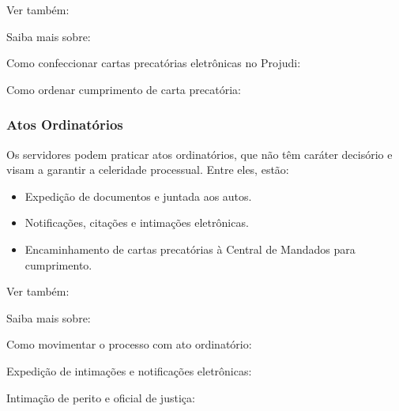 \documentclass[letterpaper,10pt,brazil]{sphinxmanual}
\begin{document}
\begin{sphinxseealso}{Ver também:}

\sphinxAtStartPar
Saiba mais sobre:

\sphinxAtStartPar
Como confeccionar cartas precatórias eletrônicas no Projudi: {\hyperref[\detokenize{projud_44_cartaprecatoriaeletronica::doc}]{}}

\sphinxAtStartPar
Como ordenar cumprimento de carta precatória: {\hyperref[\detokenize{projud_33_ordenarcumprimento::doc}]{}}


\end{sphinxseealso}



\subsubsection{Atos Ordinatórios}
\label{\detokenize{06atosintimatorios:atos-ordinatorios}}
\sphinxAtStartPar
Os servidores podem praticar atos ordinatórios, que não têm caráter decisório e visam a garantir a celeridade processual. Entre eles, estão:
\begin{itemize}
\item {} 
\sphinxAtStartPar
Expedição de documentos e juntada aos autos.

\item {} 
\sphinxAtStartPar
Notificações, citações e intimações eletrônicas.

\item {} 
\sphinxAtStartPar
Encaminhamento de cartas precatórias à Central de Mandados para cumprimento.

\end{itemize}


\begin{sphinxseealso}{Ver também:}

\sphinxAtStartPar
Saiba mais sobre:

\sphinxAtStartPar
Como movimentar o processo com ato ordinatório: {\hyperref[\detokenize{projud_06_analisejuntada_multiplaeunitaria::doc}]{}}

\sphinxAtStartPar
Expedição de intimações e notificações eletrônicas: {\hyperref[\detokenize{projud_32_expedicaomandado::doc}]{}}

\sphinxAtStartPar
Intimação de perito e oficial de justiça: {\hyperref[\detokenize{projud_34_intimarperitooj::doc}]{}}


\end{sphinxseealso}
\end{document}
